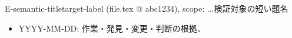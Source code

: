 \begin{vcard}{E-semantic-title}{target-label (file.tex @ abc1234), scope: ...}{検証対象の短い題名}
\vpaper
\begin{paperquote}
\end{paperquote}
\vevidence
\vstep
\vlocator
\vsource
\vgap
\vdeps
\vtest
\vopen
\vlog
\begin{itemize}
\item YYYY-MM-DD: 作業・発見・変更・判断の根拠．
\end{itemize}
\end{vcard}

